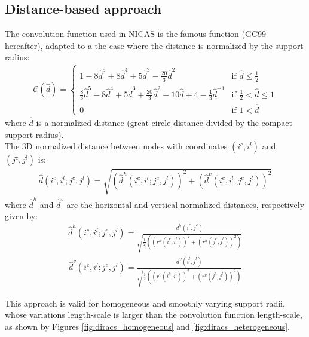\documentclass[12pt]{scrartcl}
\begin{document}
\subsection{Distance-based approach}
The convolution function used in NICAS is the famous \citet{gaspari_1999} function (GC99 hereafter), adapted to a the case where the distance is normalized by the support radius:
\begin{align}
\mathcal{C}(\widehat{d}) = \left\{
\begin{array}{ll}
\displaystyle
1 - 8 \widehat{d}^5 + 8 \widehat{d}^4 + 5 \widehat{d}^3 - \frac{20}{3} \widehat{d}^2 & \displaystyle \text{if }\widehat{d} \le \frac{1}{2} \\[2ex]
\displaystyle
\frac{8}{3} \widehat{d}^5 - 8 \widehat{d}^4 + 5 \widehat{d}^3 + \frac{20}{3} \widehat{d}^2 - 10 \widehat{d} + 4 - \frac{1}{3} \widehat{d}^{-1} & \displaystyle \text{if }\frac{1}{2} < \widehat{d} \le 1 \\[2ex]
\displaystyle
0 & \text{if } 1 < \widehat{d}
\end{array} \right.
\end{align}
where $\widehat{d}$ is a normalized distance (great-circle distance divided by the compact support radius).\\
$  $\\
The 3D normalized distance between nodes with coordinates $(i^c,i^l)$ and $(j^c,j^l)$ is:
\begin{align}
\widehat{d}(i^c,i^l;j^c,j^l) = \sqrt{\left(\widehat{d}^h(i^c,i^l;j^c,j^l)\right)^2+\left(\widehat{d}^v(i^c,i^l;j^c,j^l)\right)^2}
\end{align}
where $\widehat{d}^h$ and $\widehat{d}^v$ are the horizontal and vertical normalized distances, respectively given by:
\begin{align}
\widehat{d}^h(i^c,i^l;j^c,j^l) = \frac{d^h(i^c,j^c)}{\displaystyle \sqrt{\frac{1}{2}\left(\left(r^h(i^c,i^l)\right)^2+\left(r^h(j^c,j^l)\right)^2\right)}}
\end{align}
\begin{align}
\widehat{d}^v(i^c,i^l;j^c,j^l) = \frac{d^v(i^l,j^l)}{\displaystyle \sqrt{\frac{1}{2}\left(\left(r^v(i^c,i^l)\right)^2+\left(r^v(j^c,j^l)\right)^2\right)}}
\end{align}

This approach is valid for homogeneous and smoothly varying support radii, whose variations length-scale is larger than the convolution function length-scale, as shown by Figures \ref{fig:diracs_homogeneous} and \ref{fig:diracs_heterogeneous}.
\end{document}
